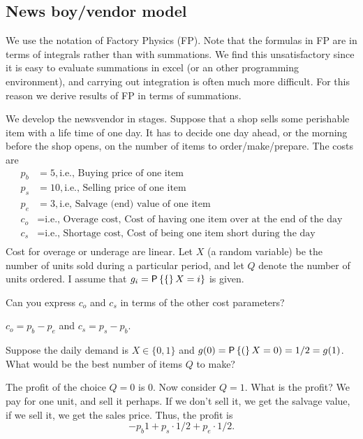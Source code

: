 \subsection{News boy/vendor model}

We use the notation of Factory Physics (FP). Note that the formulas in
FP are in terms of integrals rather than with summations. We find this
unsatisfactory since it is easy to evaluate summations in excel (or an
other programming environment), and carrying out integration is often
much more difficult. For this reason we derive  results of FP in terms
of summations. 


We develop the newsvendor in stages.  Suppose that a shop sells some
perishable item with a life time of one day. It has to decide one day
ahead, or the morning before the shop opens, on the number of items to
order/make/prepare. The costs are
\begin{align*}
  p_b &= 5, \text{i.e., Buying price of one item} \\
  p_s &= 10,  \text{i.e., Selling  price of one item} \\
  p_e &= 3, \text{i.e, Salvage (end) value of one item} \\
  c_o &= \text{i.e., Overage cost, Cost of having  one  item over at the end of the day} \\
  c_s &= \text{i.e., Shortage cost, Cost of being   one  item short during the day} \\
\end{align*}
Cost for overage or underage are linear.  Let $X$ (a random variable)
be the number of units sold during a particular period, and let $Q$
denote the number of units ordered.  I assume that
$g_i = \P\{ X = i\}$ is given.


\begin{question}
  Can you express $c_o$ and $c_s$ in terms of the other cost parameters?
  \begin{solution}
    $c_o = p_b-p_e$ and $c_s = p_s-p_b$. 
  \end{solution}
\end{question}


\begin{question}
Suppose the daily demand is $X\in \{0,1\}$ and $g(0) = \P(X=0)=1/2 = g(1)$. What would be the best number of items $Q$ to make? 
\begin{solution}
  The profit of the choice $Q=0$ is 0. Now consider $Q=1$. What is the profit?  We pay for one unit, and sell it perhaps. If we don't sell it, we get the salvage value, if we sell it, we get the sales price. Thus, the profit is
  \begin{equation*}
    -p_b 1 + p_s\cdot 1/2 + p_e\cdot 1/2. 
  \end{equation*}
\end{solution}
\end{question}


